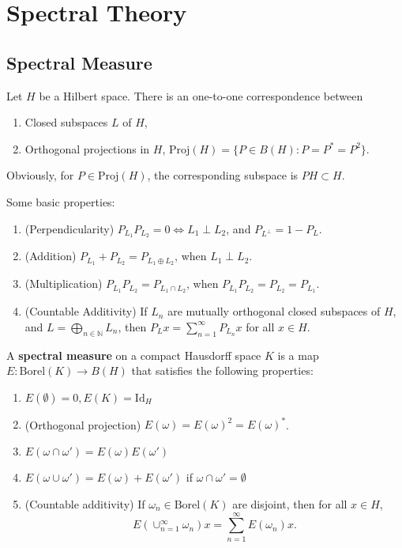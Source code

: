
\section{Spectral Theory}
\subsection{Spectral Measure}

\begin{proposition}
	\label{prop:SubspaceProjection}
	Let $H$ be a Hilbert space. There is an one-to-one correspondence between
	\begin{enumerate}
		\item Closed subspaces $L$ of $H$,
		\item Orthogonal projections in $H$, $\text{Proj}(H) = \{P \in B(H): P = P^* = P^2\} $.
	\end{enumerate}
\end{proposition}
Obviously, for $P \in \text{Proj}(H)$, the corresponding subspace is $PH \subset H$.

\begin{remark}
	Some basic properties:
	\begin{enumerate}
		\item (Perpendicularity) $P_{L_1} P_{L_2} = 0 \iff L_1 \perp L_2$, and $P_{L^\perp} = 1 - P_L$.
		\item (Addition) $P_{L_1} + P_{L_2} = P_{L_1 \oplus L_2}$, when $L_1 \perp L_2$.
		\item (Multiplication) $P_{L_1} P_{L_2} = P_{L_1 \cap L_2}$, when $P_{L_1} P_{L_2} = P_{L_2} = P_{L_1}$. 
		\item (Countable Additivity) If $L_{n}$ are mutually orthogonal closed subspaces of $H$, and $L = \bigoplus_{n \in \mathbb{N}} L_n$, then $P_L x = \sum_{n=1}^{\infty} P_{L_n}x $ for all $x \in H$.
	\end{enumerate}
\end{remark}

\begin{definition}
	\label{defn:SpectralMeasure}
	A \textbf{spectral measure} on a compact Hausdorff space $K$ is a map $E: \text{Borel}(K) \to B(H)$ that satisfies the following properties:
	\begin{enumerate}
		\item $E(\emptyset ) = 0, E(K) = \text{Id}_H$
		\item (Orthogonal projection) $E(\omega) = E(\omega)^2 = E(\omega)^*$.
		\item $E\left( \omega \cap \omega' \right)  = E(\omega) E(\omega')$
		\item $E\left( \omega \cup \omega' \right) = E(\omega) + E(\omega')$ if $\omega \cap \omega '= \emptyset $
		\item (Countable additivity) If  $\omega_n \in \text{Borel}(K)$ are disjoint, then for all $x \in H$,
			\[
				E\left( \cup _{n = 1}^\infty  \omega_n \right)  x = \sum_{n = 1}^\infty E(\omega_n) x
			.\] 
	\end{enumerate}
\end{definition}

